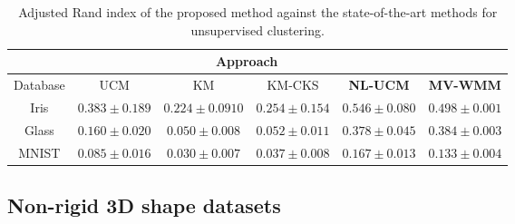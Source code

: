 \documentclass[]{article}
\begin{document}
\begin{table}[ht!]
	\centering
	\caption{Adjusted Rand index of the proposed method against the state-of-the-art methods for unsupervised clustering.}
	\label{tab:comparison}
	\begin{tabular}{c c c c c c}
		\cline{2-6}
		& \multicolumn{4}{c}{\textbf{Approach}}\\
		\hline
		Database &  	UCM & KM & KM-CKS& \textbf{NL-UCM} & \textbf{MV-WMM}\\
		\hline\hline
		Iris & $0.383\pm0.189$ &  $0.224 \pm 0.0910$  &  $0.254 \pm 0.154$ &$\mathbf{0.546\pm 0.080}$ & $\mathbf{0.498\pm 0.001}$\\
		Glass & $0.160 \pm 0.020$ & $0.050 \pm 0.008$     &  $0.052 \pm 0.011$       & $\mathbf{0.378\pm 0.045}$ & $\mathbf{0.384\pm 0.003}$\\
		MNIST & $0.085 \pm 0.016$&      $0.030 \pm 0.007$   &  $0.037 \pm 0.008$  & $\mathbf{0.167\pm 0.013}$ & $\mathbf{0.133\pm 0.004}$\\
	\end{tabular}
\end{table}

\subsection{Non-rigid 3D shape datasets}
\end{document}
